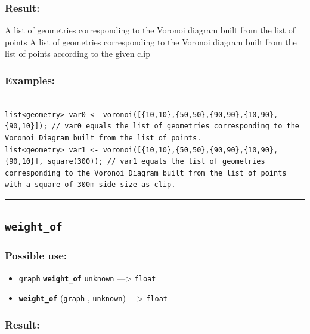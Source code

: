 \documentclass[]{book}
\providecommand{\tightlist}{%
  \setlength{\itemsep}{0pt}\setlength{\parskip}{0pt}}
\theoremstyle{definition}
\theoremstyle{definition}
\theoremstyle{definition}
\theoremstyle{remark}
\begin{document}
\subsubsection{Result:}\label{result-531}

A list of geometries corresponding to the Voronoi diagram built from the
list of points A list of geometries corresponding to the Voronoi diagram
built from the list of points according to the given clip

\subsubsection{Examples:}\label{examples-379}

\begin{verbatim}
 
list<geometry> var0 <- voronoi([{10,10},{50,50},{90,90},{10,90},{90,10}]); // var0 equals the list of geometries corresponding to the Voronoi Diagram built from the list of points. 
list<geometry> var1 <- voronoi([{10,10},{50,50},{90,90},{10,90},{90,10}], square(300)); // var1 equals the list of geometries corresponding to the Voronoi Diagram built from the list of points with a square of 300m side size as clip.
\end{verbatim}

\begin{center}\rule{0.5\linewidth}{\linethickness}\end{center}

\subsection{\texorpdfstring{\texttt{weight\_of}}{weight\_of}}\label{weight_of}

\subsubsection{Possible use:}\label{possible-use-553}

\begin{itemize}
\tightlist
\item
  \texttt{graph} \textbf{\texttt{weight\_of}} \texttt{unknown}
  ---\textgreater{} \texttt{float}
\item
  \textbf{\texttt{weight\_of}} (\texttt{graph} , \texttt{unknown})
  ---\textgreater{} \texttt{float}
\end{itemize}

\subsubsection{Result:}\label{result-532}
\end{document}
